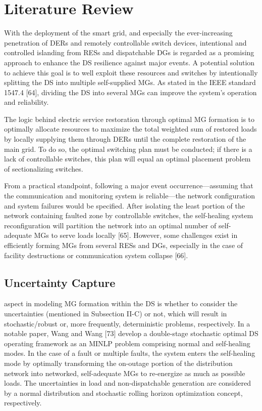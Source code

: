 \documentclass[conference]{IEEEtran}
\begin{document}
\section{Literature Review}
With the deployment of the smart grid, and especially the ever-increasing penetration of DERs and remotely controllable switch devices, intentional and controlled islanding from RESs and dispatchable DGs is regarded as a promising approach to enhance the DS resilience against major events. A potential solution to achieve this goal is to well exploit these resources and switches by intentionally splitting the DS into multiple self-supplied MGs. As stated in the IEEE standard 1547.4 [64], dividing the DS into several MGs can improve the system’s operation and reliability.

The logic behind electric service restoration through optimal MG formation is to optimally allocate resources to maximize the total weighted sum of restored loads by locally supplying them through DERs until the complete restoration of the main grid. To do so, the optimal switching plan must be conducted; if there is a lack of controllable switches, this plan will equal an optimal placement problem of sectionalizing switches.

From a practical standpoint, following a major event occurrence—assuming that the communication and monitoring system is reliable—the network configuration and system failures would be specified. After isolating the least portion of the network containing faulted zone by controllable switches, the self-healing system reconfiguration will partition the network into an optimal number of self-adequate MGs to serve loads locally [65]. However, some challenges exist in efficiently forming MGs from several RESs and DGs, especially in the case of facility destructions or communication system collapse [66].

\subsection{Uncertainty Capture}
aspect in modeling MG formation within the DS is whether to consider the uncertainties (mentioned in Subsection II-C) or not, which will result in stochastic/robust or, more frequently, deterministic problems, respectively. In a notable paper, Wang and Wang [73] develop a double-stage stochastic optimal DS operating framework as an MINLP problem comprising normal and self-healing modes. In the case of a fault or multiple faults, the system enters the self-healing mode by optimally transforming the on-outage portion of the distribution network into networked, self-adequate MGs to re-energize as much as possible loads. The uncertainties in load and non-dispatchable generation are considered by a normal distribution and stochastic rolling horizon optimization concept, respectively.
\end{document}
